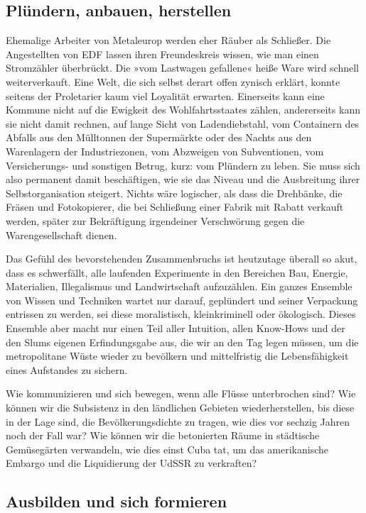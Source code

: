 \subsection{Plündern, anbauen, herstellen}

Ehemalige Arbeiter von Metaleurop werden eher Räuber als Schließer.
Die Angestellten von EDF lassen ihren Freundeskreis wissen, wie man
einen Stromzähler überbrückt. Die »vom Lastwagen gefallene« heiße
Ware wird schnell weiterverkauft. Eine Welt, die sich selbst derart
offen zynisch erklärt, konnte seitens der Proletarier kaum viel
Loyalität erwarten.
Einerseits kann eine Kommune nicht auf die Ewigkeit des
Wohlfahrtsstaates zählen, andererseits kann sie nicht damit
rechnen, auf lange Sicht von Ladendiebstahl, vom Containern des
Abfalls aus den Mülltonnen der Supermärkte oder des Nachts aus den
Warenlagern der Industriezonen, vom Abzweigen von Subventionen, vom
Versicherungs- und sonstigen Betrug, kurz: vom Plündern zu leben.
Sie muss sich also permanent damit beschäftigen, wie sie das Niveau
und die Ausbreitung ihrer Selbstorganisation steigert. Nichts wäre
logischer, als dass die Drehbänke, die Fräsen und Fotokopierer, die
bei Schließung einer Fabrik mit Rabatt verkauft werden, später zur
Bekräftigung irgendeiner Verschwörung gegen die Warengesellschaft
dienen.

Das Gefühl des bevorstehenden Zusammenbruchs ist heutzutage überall
so akut, dass es schwerfällt, alle laufenden Experimente in den
Bereichen Bau, Energie, Materialien, Illegalismus und
Landwirtschaft aufzuzählen. Ein ganzes Ensemble von Wissen und
Techniken wartet nur darauf, geplündert und seiner Verpackung
entrissen zu werden, sei diese moralistisch, kleinkriminell oder
ökologisch. Dieses Ensemble aber macht nur einen Teil aller
Intuition, allen Know-Hows und der den Slums eigenen Erfindungsgabe
aus, die wir an den Tag legen müssen, um die metropolitane Wüste
wieder zu bevölkern und mittelfristig die Lebensfähigkeit eines
Aufstandes zu sichern.

Wie kommunizieren und sich bewegen, wenn alle Flüsse unterbrochen
sind? Wie können wir die Subsistenz in den ländlichen Gebieten
wiederherstellen, bis diese in der Lage sind, die
Bevölkerungsdichte zu tragen, wie dies vor sechzig Jahren noch der
Fall war? Wie können wir die betonierten Räume in städtische
Gemüsegärten verwandeln, wie dies einst Cuba tat, um das
amerikanische Embargo und die Liquidierung der UdSSR zu
verkraften?

\subsection{Ausbilden und sich formieren}

